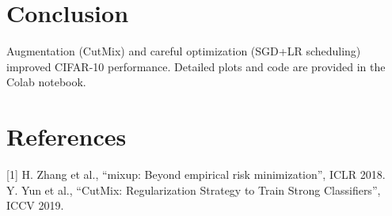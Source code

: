 \documentclass[conference]{IEEEtran}
\begin{document}
\section{Conclusion}
Augmentation (CutMix) and careful optimization (SGD+LR scheduling) improved CIFAR-10 performance. Detailed plots and code are provided in the Colab notebook.

\section*{References}
[1] H. Zhang et al., ``mixup: Beyond empirical risk minimization'', ICLR 2018.\\
[2] Y. Yun et al., ``CutMix: Regularization Strategy to Train Strong Classifiers'', ICCV 2019.
\end{document}
